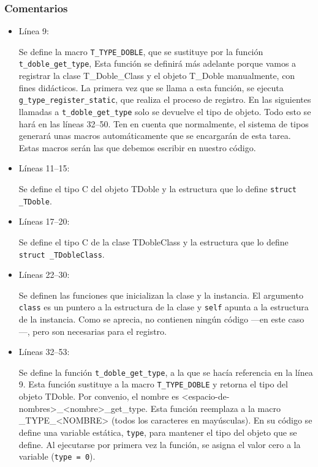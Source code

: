 \subsubsection{Comentarios}
\begin{itemize}
\item Línea 9:\par
  Se define la macro \texttt{T\_TYPE\_DOBLE}, que se sustituye por la función
  \texttt{t\_doble\_get\_type}, Esta función se definirá más adelante porque vamos a registrar la clase \textsf{T\_Doble\_Class} y  el objeto \textsf{T\_Doble} manualmente, con fines didácticos.
  La primera vez que se llama a esta función, se ejecuta \texttt{g\_type\_register\_static}, que realiza el
  proceso de registro. En las siguientes llamadas a \texttt{t\_doble\_get\_type} solo se devuelve el tipo de objeto.
  Todo esto se hará en las líneas 32--50.
  Ten en cuenta que normalmente, el sistema de tipos generará unas macros automáticamente que se encargarán
  de esta tarea. Estas macros serán las que debemos escribir en nuestro código.
\item Líneas 11--15:\par
  Se define el tipo C del objeto \textsf{TDoble} y la estructura que lo define \texttt{struct \_TDoble}.
\item Líneas 17--20:\par
  Se define el tipo C de la clase \textsf{TDobleClass} y la estructura que lo define \texttt{struct \_TDobleClass}.
\item Líneas 22--30:\par
  Se definen las funciones que inicializan la clase y la instancia. El argumento \texttt{class} es un puntero a
  la estructura de la clase y \texttt{self} apunta a la estructura de la instancia.
  Como se aprecia, no contienen ningún código ---en este caso---, pero son necesarias para el registro.
\item Líneas 32--53:\par
  Se define la función \texttt{t\_doble\_get\_type}, a la que se hacía referencia en la línea 9.
  Esta función sustituye a la macro \texttt{T\_TYPE\_DOBLE} y retorna el tipo del objeto \textsf{TDoble}.
  Por convenio, el nombre es \textsf{<espacio-de-nombres>\_<nombre>\_get\_type}. Esta función reemplaza
  a la macro \textsf{\_TYPE\_<NOMBRE>} (todos los caracteres en mayúsculas).
  En su código se define una variable estática, \texttt{type}, para mantener el tipo del objeto que se define.
  Al ejecutarse por primera vez la función, se asigna el valor cero a la variable (\texttt{type = 0}).

\end{itemize}
